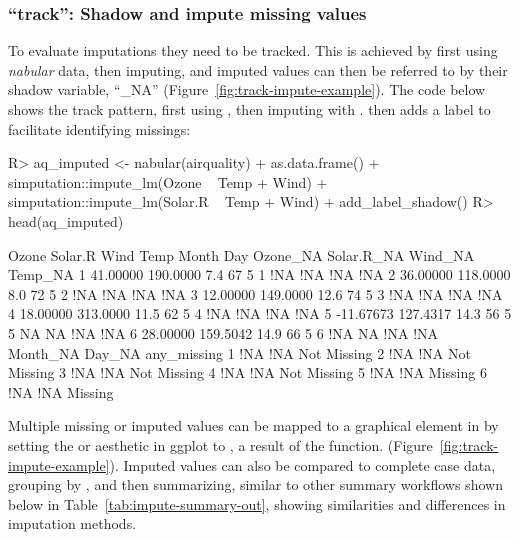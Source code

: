 \documentclass[article]{jss}
\begin{document}
\hypertarget{verbs-track}{%
\subsubsection{``track'': Shadow and impute missing values}\label{verbs-track}}

To evaluate imputations they need to be tracked.  This is achieved by first
using \emph{nabular} data, then imputing, and imputed values can then be
referred to by their shadow variable, ``\_NA''
(Figure~\ref{fig:track-impute-example}).  The code below shows the track
pattern, first using , then imputing with
.   then adds a label to facilitate
identifying missings:
%
\begin{CodeChunk}
\begin{CodeInput}
R> aq_imputed <- nabular(airquality) %
+   as.data.frame() %
+   simputation::impute_lm(Ozone ~ Temp + Wind) %
+   simputation::impute_lm(Solar.R ~ Temp + Wind) %
+   add_label_shadow()
R> head(aq_imputed)
\end{CodeInput}
\begin{CodeOutput}
      Ozone  Solar.R Wind Temp Month Day Ozone_NA Solar.R_NA Wind_NA Temp_NA
1  41.00000 190.0000  7.4   67     5   1      !NA        !NA     !NA     !NA
2  36.00000 118.0000  8.0   72     5   2      !NA        !NA     !NA     !NA
3  12.00000 149.0000 12.6   74     5   3      !NA        !NA     !NA     !NA
4  18.00000 313.0000 11.5   62     5   4      !NA        !NA     !NA     !NA
5 -11.67673 127.4317 14.3   56     5   5       NA         NA     !NA     !NA
6  28.00000 159.5042 14.9   66     5   6      !NA         NA     !NA     !NA
  Month_NA Day_NA any_missing
1      !NA    !NA Not Missing
2      !NA    !NA Not Missing
3      !NA    !NA Not Missing
4      !NA    !NA Not Missing
5      !NA    !NA     Missing
6      !NA    !NA     Missing
\end{CodeOutput}
\end{CodeChunk}
%
Multiple missing or imputed values can be mapped to a graphical element in
 by setting the  or  aesthetic in ggplot to
, a result of the  function.
(Figure~\ref{fig:track-impute-example}).  Imputed values can also be
compared to complete case data, grouping by , and then
summarizing, similar to other  summary workflows shown below in
Table~\ref{tab:impute-summary-out}, showing similarities and differences in
imputation methods.
\end{document}
